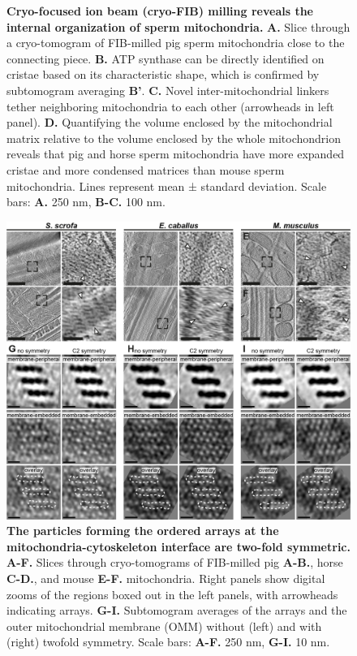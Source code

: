 \begin{subappendices}
\begin{figure}[hbt]
		\caption{\textbf{Cryo-focused ion beam (cryo-FIB) milling reveals the internal organization of sperm mitochondria.} \textbf{A.} Slice through a cryo-tomogram of FIB-milled pig sperm mitochondria close to the connecting piece. \textbf{B.} ATP synthase can be directly identified on cristae based on its characteristic shape, which is confirmed by subtomogram averaging \textbf{B'}. \textbf{C.} Novel inter-mitochondrial linkers tether neighboring mitochondria to each other (arrowheads in left panel). \textbf{D.} Quantifying the volume enclosed by the mitochondrial matrix relative to the volume enclosed by the whole mitochondrion reveals that pig and horse sperm mitochondria have more expanded cristae and more condensed matrices than mouse sperm mitochondria. Lines represent mean ± standard deviation. Scale bars: \textbf{A.} 250 nm, \textbf{B-C.} 100 nm.}
		\label{fig:ch4_app_fig2}
	\end{figure}
	\begin{figure}[hbt]
		\center
		\includegraphics[]{Chapter.4/Figures/SI_Figure3.png}
		\caption{\textbf{The particles forming the ordered arrays at the mitochondria-cytoskeleton interface are two-fold symmetric.} \textbf{A-F.} Slices through cryo-tomograms of FIB-milled pig \textbf{A-B.}, horse \textbf{C-D.}, and mouse \textbf{E-F.} mitochondria. Right panels show digital zooms of the regions boxed out in the left panels, with arrowheads indicating arrays. \textbf{G-I.} Subtomogram averages of the arrays and the outer mitochondrial membrane (OMM) without (left) and with (right) twofold symmetry. Scale bars: \textbf{A-F.} 250 nm, \textbf{G-I.} 10 nm.}

\end{figure}
\end{subappendices}

